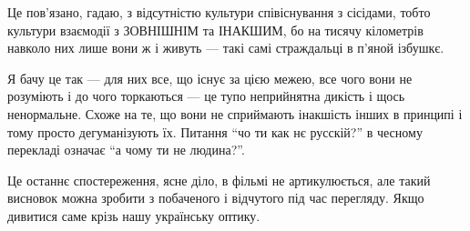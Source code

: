 Це пов'язано, гадаю, з відсутністю культури співіснування з сісідами, тобто
культури взаємодії з ЗОВНІШНІМ та ІНАКШИМ, бо на тисячу кілометрів навколо них
лише вони ж і живуть --- такі самі страждальці в п'яной ізбушкє. 

Я бачу це так --- для них все, що існує за цією межею, все чого вони не розуміють
і до чого торкаються --- це тупо неприйнятна дикість і щось ненормальне. Схоже на
те, що вони не сприймають інакшість інших в принципі і тому просто
дегуманізують їх. Питання \enquote{чо ти как нє русскій?} в чесному перекладі означає
\enquote{а чому ти не людина?}.

Це останнє спостереження, ясне діло, в фільмі не артикулюється, але такий
висновок можна зробити з побаченого і відчутого під час перегляду. Якщо
дивитися саме крізь нашу українську оптику.
